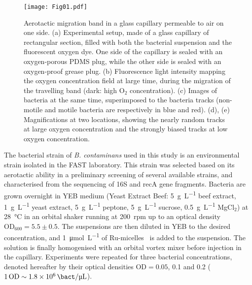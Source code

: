 \documentclass[aps,a4paper,twocolumn,10pt,pre,showpacs]{revtex4-2}
\begin{document}
\begin{figure}
\texttt{[image: Fig01.pdf]} 
\caption{Aerotactic migration band in a glass capillary permeable to air on one side. (a) Experimental setup, made of a glass capillary of rectangular section, filled with both the bacterial suspension and the fluorescent oxygen dye. One side of the capillary is sealed with an oxygen-porous PDMS plug, while the other side is sealed with an oxygen-proof grease plug. (b) Fluorescence light intensity mapping the oxygen concentration field at large time, during the migration of the travelling band (dark: high O$_2$ concentration). (c) Images of bacteria at the same time, superimposed to the bacteria tracks (non-motile and motile bacteria are respectively in blue and red). (d), (e) Magnifications at two locations, showing the nearly random tracks at large oxygen concentration and the strongly biased tracks at low oxygen concentration.}
\label{fig:setup}
\end{figure}

The bacterial strain of \emph{B. contaminans} used in this study is an environmental strain isolated in the FAST laboratory. This strain was selected based on its aerotactic ability in a preliminary screening of several available strains, and characterised from the sequencing of 16S and recA gene fragments. Bacteria are grown overnight in YEB medium (Yeast Extract Beef: \SI{5}{\g\per\liter} beef extract, \SI{1}{\g\per\liter} yeast extract, \SI{5}{\g\per\liter} peptone, \SI{5}{\g\per\liter} sucrose, \SI{0.5}{\g\per\liter} MgCl$_2$) at \SI{28}{\celsius} in an orbital shaker running at \SI{200}{rpm} up to an optical density $\text{OD}_{600}=5.5\pm0.5$. The suspensions are then diluted in YEB to the desired concentration, and \SI{1}{\umol\per\liter} of Ru-micelles~\cite{douarche2009coli} is added to the suspension. The solution is finally homogenised with an orbital vortex mixer before injection in the capillary. Experiments were repeated for three bacterial concentrations, denoted hereafter by their optical densities $\text{OD}=0.05$, 0.1 and 0.2 ($\SI{1}{OD} \sim \SI{1.8e6}{\bact\per\uL}$).
\end{document}
